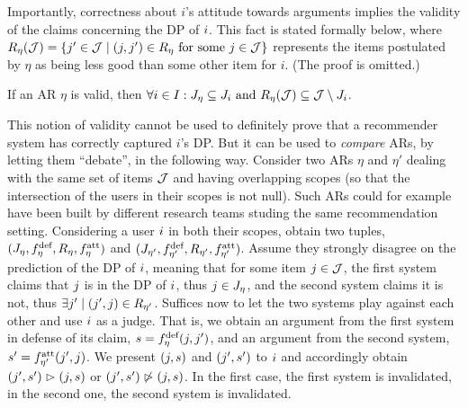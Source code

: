 \documentclass[version=3.21, pagesize, twoside=off, bibliography=totoc, DIV=calc, fontsize=12pt, a4paper, french, english]{scrartcl}
\begin{document}
Importantly, correctness about $i$’s attitude towards arguments implies the validity of the claims concerning the \ac{DP} of $\usr$. This fact is stated formally below, where $R_\eta(\allitems) = \set{\itm' \in \allitems \suchthat (\itm, \itm') \in R_\eta \text{ for some } \itm \in \allitems}$ represents the items postulated by $\eta$ as being less good than some other item for $i$. (The proof is omitted.)
\begin{theorem}
	If an \ac{AR} $\eta$ is valid, then $\forall \usr \in \allusers: \mitems \subseteq \uitems \text{ and } R_\eta(\allitems) \subseteq \allitems \setminus \uitems$.
\end{theorem}

	This notion of validity cannot be used to definitely prove that a recommender system has correctly captured $i$’s \ac{DP}. But it can be used to \emph{compare} \acp{AR}, by letting them “debate”, in the following way. Consider two \acp{AR} $\eta$ and $\eta'$ dealing with the same set of items $\allitems$ and having overlapping scopes (so that the intersection of the users in their scopes is not null). Such \acp{AR} could for example have been built by different research teams studing the same recommendation setting. Considering a user $\usr$ in both their scopes, obtain two tuples, $(\mitems, \mdef, R_\eta, \matt)$ and $(\mitems[\eta'], \mdef[\eta'], R_{\eta'}, \matt[\eta'])$. Assume they strongly disagree on the prediction of the \ac{DP} of $\usr$, meaning that for some item $\itm \in \allitems$, the first system claims that $\itm$ is in the \ac{DP} of $\usr$, thus $\itm \in \mitems$, and the second system claims it is not, thus $\exists \itm' \suchthat (\itm', \itm) \in R_{\eta'}$. Suffices now to let the two systems play against each other and use $\usr$ as a judge. That is, we obtain an argument from the first system in defense of its claim, $\ar = \mdef(\itm, \itm')$, and an argument from the second system, $\ar' = \matt[\eta'](\itm', \itm)$. We present $(\itm, \ar)$ and $(\itm', \ar')$ to $\usr$ and accordingly obtain $(\itm', \ar') \ibeats (\itm, \ar)$ or $(\itm', \ar') \nibeats (\itm, \ar)$. In the first case, the first system is invalidated, in the second one, the second system is invalidated.
\end{document}
